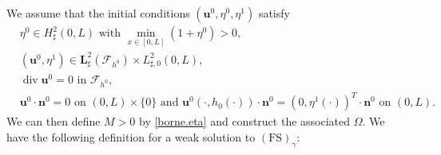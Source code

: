 \documentclass[JEP,XML,SOM,Unicode,NoFloatCountersInSection]{cedram}
\let\mathcal\mathscr
\newcommand{\FS}{\mathrm{FS}}
\theoremstyle{remark}
\theoremstyle{definition}
\newcommand{\ug}{\boldsymbol{u}}
\DeclareMathOperator{\DIV}{div}
\newcommand{\BS}[1]{\boldsymbol{#1}}
\let\CM\Omega
\begin{document}
We assume that the initial conditions $(\ug^{0},\eta^{0},\eta^{1})$ satisfy\vspace*{-3pt}
\begin{align}
&\eta^{0}\in H^{2}_{\sharp}(0,L) \text{ with }\min_{x\in [0,L]}(1+\eta^{0})>0,\label{CI1}\\
&(\ug^0,\eta^{1})\in \BS{L}_\sharp^{2}(\mathcal{F}_{h^{0}})\times L_{\sharp, 0}^{2}(0,L),\label{CI2}\\
& \DIV{\ug^{0}}=0 \text{ in }\mathcal{F}_{h^{0}},\label{CI3}\\
&\ug^{0}\cdot \BS{n}^0 = 0 \text{ on } (0, L)\times \{0\} \text{ and } \ug^{0}(\cdot, h_0(\cdot))\cdot \BS{n}^0= (0, \eta^{1}(\cdot) )^T\cdot \BS{n}^0\text{ on }(0, L).\label{CI4}
\end{align}
We can then define $M>0$ by \eqref{borne.eta} and construct the associated $\CM$.
We have the following definition for a weak solution to $(\FS)_{\gamma}$:
\end{document}
